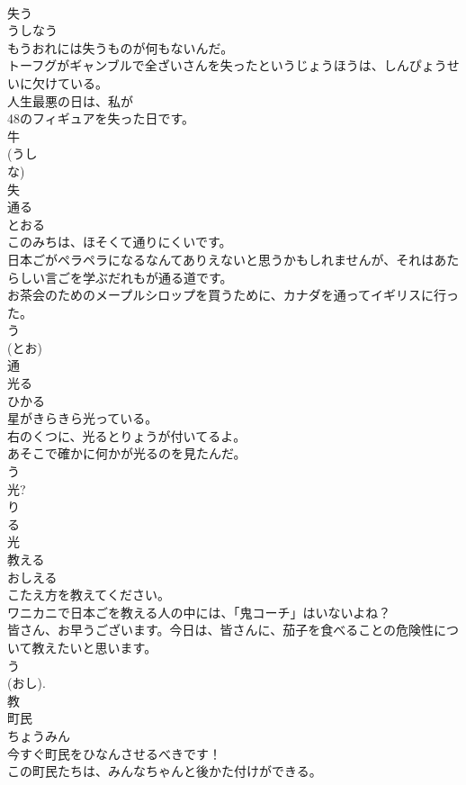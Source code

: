 \documentclass[8pt]{extreport}
\begin{document}
\begin{CJK}{UTF8}{min}
\\	失う	
\\	うしなう	
\\	もうおれには失うものが何もないんだ。	
\\	トーフグがギャンブルで全ざいさんを失ったというじょうほうは、しんぴょうせいに欠けている。	
\\	人生最悪の日は、私が
\\	48のフィギュアを失った日です。	
\\	牛 
\\	(うし 
\\	な) 
\\	失	
\\	通る	
\\	とおる	
\\	このみちは、ほそくて通りにくいです。	
\\	日本ごがペラペラになるなんてありえないと思うかもしれませんが、それはあたらしい言ごを学ぶだれもが通る道です。	
\\	お茶会のためのメープルシロップを買うために、カナダを通ってイギリスに行った。	
\\	う 
\\	(とお) 
\\	通	
\\	光る	
\\	ひかる	
\\	星がきらきら光っている。	
\\	右のくつに、光るとりょうが付いてるよ。	
\\	あそこで確かに何かが光るのを見たんだ。	
\\	う 
\\	光? 
\\	り 
\\	る 
\\	光	
\\	教える	
\\	おしえる	
\\	こたえ方を教えてください。	
\\	ワニカニで日本ごを教える人の中には、「鬼コーチ」はいないよね？	
\\	皆さん、お早うございます。今日は、皆さんに、茄子を食べることの危険性について教えたいと思います。	
\\	う 
\\	(おし).
\\	教	
\\	町民	
\\	ちょうみん	
\\	今すぐ町民をひなんさせるべきです！	
\\	この町民たちは、みんなちゃんと後かた付けができる。	

\end{CJK}
\end{document}
